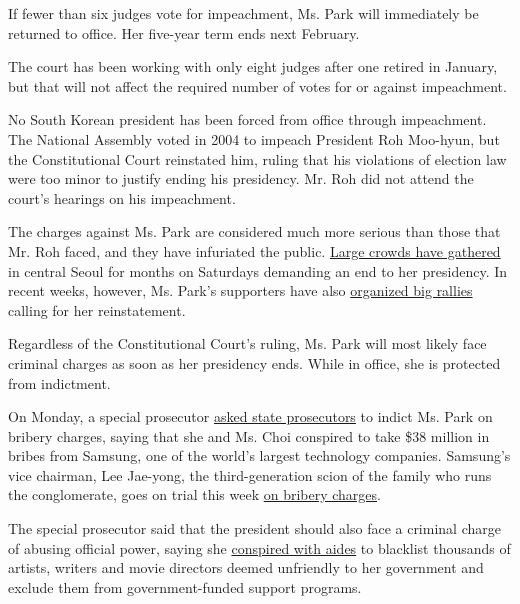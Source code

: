 If fewer than six judges vote for impeachment, Ms. Park will immediately
be returned to office. Her five-year term ends next February.

The court has been working with only eight judges after one retired in
January, but that will not affect the required number of votes for or
against impeachment.

No South Korean president has been forced from office through
impeachment. The National Assembly voted in 2004 to impeach President
Roh Moo-hyun, but the Constitutional Court reinstated him, ruling that
his violations of election law were too minor to justify ending his
presidency. Mr. Roh did not attend the court's hearings on his
impeachment.

The charges against Ms. Park are considered much more serious than those
that Mr. Roh faced, and they have infuriated the public.
\href{https://www.nytimes3xbfgragh.onion/2016/11/13/world/asia/korea-park-geun-hye-protests.html}{Large
crowds have gathered} in central Seoul for months on Saturdays demanding
an end to her presidency. In recent weeks, however, Ms. Park's
supporters have also
\href{https://www.nytimes3xbfgragh.onion/2017/02/18/world/asia/south-korea-impeached-leader-park-geun-hye.html}{organized
big rallies} calling for her reinstatement.

Regardless of the Constitutional Court's ruling, Ms. Park will most
likely face criminal charges as soon as her presidency ends. While in
office, she is protected from indictment.

On Monday, a special prosecutor
\href{https://www.nytimes3xbfgragh.onion/2017/03/06/world/asia/president-park-geun-hye-bribery-korea.html}{asked
state prosecutors} to indict Ms. Park on bribery charges, saying that
she and Ms. Choi conspired to take \$38 million in bribes from Samsung,
one of the world's largest technology companies. Samsung's vice
chairman, Lee Jae-yong, the third-generation scion of the family who
runs the conglomerate, goes on trial this week
\href{https://www.nytimes3xbfgragh.onion/2017/02/28/world/asia/lee-jae-yong-samsung.html}{on
bribery charges}.

The special prosecutor said that the president should also face a
criminal charge of abusing official power, saying she
\href{https://www.nytimes3xbfgragh.onion/2017/01/12/world/asia/south-korea-president-park-blacklist-artists.html}{conspired
with aides} to blacklist thousands of artists, writers and movie
directors deemed unfriendly to her government and exclude them from
government-funded support programs.

